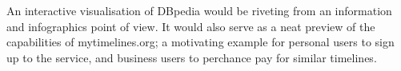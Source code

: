 An interactive visualisation of DBpedia would be riveting from an information 
and infographics point of view. It would also serve as a neat preview of the 
capabilities of mytimelines.org; a motivating example for personal users to 
sign up to the service, and business users to perchance pay for similar 
timelines.
